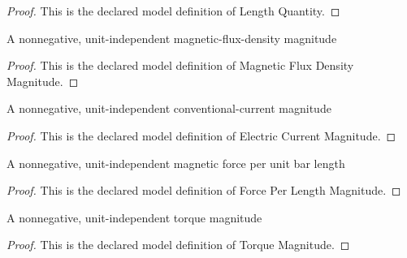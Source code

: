 \begin{proof}
  This is the declared model definition of Length Quantity.
\end{proof}
\begin{definition}
  \label{def:physics:phyx-mini-0949:phyxminiproblems-problemphyxmini0949-magneticfluxdensitymagnitude}
  A nonnegative, unit-independent magnetic-flux-density magnitude
\end{definition}
\begin{proof}
  This is the declared model definition of Magnetic Flux Density Magnitude.
\end{proof}
\begin{definition}
  \label{def:physics:phyx-mini-0949:phyxminiproblems-problemphyxmini0949-electriccurrentmagnitude}
  A nonnegative, unit-independent conventional-current magnitude
\end{definition}
\begin{proof}
  This is the declared model definition of Electric Current Magnitude.
\end{proof}
\begin{definition}
  \label{def:physics:phyx-mini-0949:phyxminiproblems-problemphyxmini0949-forceperlengthmagnitude}
  A nonnegative, unit-independent magnetic force per unit bar length
\end{definition}
\begin{proof}
  This is the declared model definition of Force Per Length Magnitude.
\end{proof}
\begin{definition}
  \label{def:physics:phyx-mini-0949:phyxminiproblems-problemphyxmini0949-torquemagnitude}
  A nonnegative, unit-independent torque magnitude
\end{definition}
\begin{proof}
  This is the declared model definition of Torque Magnitude.
\end{proof}
